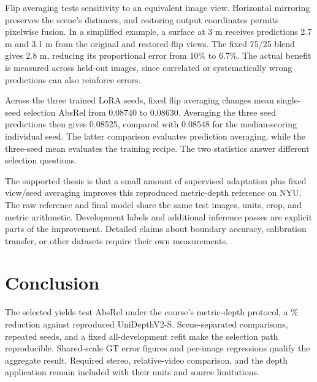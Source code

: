 \documentclass[10pt,twocolumn,letterpaper]{article}
\begin{document}
Flip averaging tests sensitivity to an equivalent image view. Horizontal mirroring preserves the scene's distances, and restoring output coordinates permits pixelwise fusion. In a simplified example, a surface at 3 m receives predictions 2.7 m and 3.1 m from the original and restored-flip views. The fixed 75/25 blend gives 2.8 m, reducing its proportional error from 10\% to 6.7\%. The actual benefit is measured across held-out images, since correlated or systematically wrong predictions can also reinforce errors.

Across the three trained LoRA seeds, fixed flip averaging changes mean single-seed selection AbsRel from 0.08740 to 0.08630. Averaging the three seed predictions then gives 0.08525, compared with 0.08548 for the median-scoring individual seed. The latter comparison evaluates prediction averaging, while the three-seed mean evaluates the training recipe. The two statistics answer different selection questions.

The supported thesis is that a small amount of supervised adaptation plus fixed view/seed averaging improves this reproduced metric-depth reference on NYU. The raw reference and final model share the same test images, units, crop, and metric arithmetic. Development labels and additional inference passes are explicit parts of the improvement. Detailed claims about boundary accuracy, calibration transfer, or other datasets require their own measurements.

\section{Conclusion}
The selected \ResearchMethod{} yields test AbsRel \ResearchFinalAbs{} under the course's metric-depth protocol, a \ResearchGain\% reduction against reproduced UniDepthV2-S. Scene-separated comparisons, repeated seeds, and a fixed all-development refit make the selection path reproducible. Shared-scale GT error figures and per-image regressions qualify the aggregate result. Required stereo, relative-video comparison, and the depth application remain included with their units and source limitations.
\clearpage
\twocolumn
{\small


}
\end{document}
